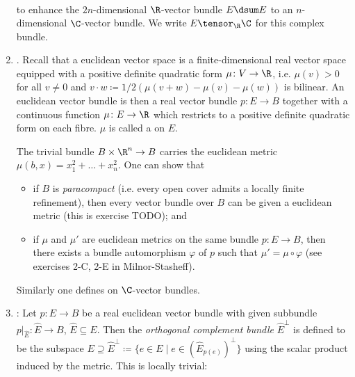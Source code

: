 \begin{definition}
\begin{enumerate}[resume]
\begin{align*}
			\end{align*}
			to enhance the $2n$-dimensional $\R$-vector bundle $E \dsum E$ to an $n$-dimensional $\C$-vector bundle.
			We write $E \tensor_{\R} \C$ for this complex bundle.
		\item {}.
			Recall that a euclidean vector space is a finite-dimensional real vector space equipped with a positive definite quadratic form $\mu\colon V \to \R$, i.e. $\mu(v) > 0$ for all $v \neq 0$ and $v \cdot w \coloneq 1 / 2 (\mu(v + w) - \mu(v) - \mu(w))$ is bilinear.
			An euclidean vector bundle is then a real vector bundle $p\colon E \to B$ together with a continuous function $\mu\colon E \to \R$ which restricts to a positive definite quadratic form on each fibre.
			$\mu$ is called a  on $E$.
			\begin{example}
				The trivial bundle $B \times \R^n \to B$ carries the euclidean metric $\mu(b, x) = x_1^2 + \ldots + x_n^2$.
				One can show that
				\begin{itemize}
					\item if $B$ is \emph{paracompact} (i.e. every open cover admits a locally finite refinement), then every vector bundle over $B$ can be given a euclidean metric (this is exercise TODO); and 
					\item if $\mu$ and $\mu'$ are euclidean metrics on the same bundle $p\colon E \to B$, then there exists a bundle automorphism $\varphi$ of $p$ such that $\mu' = \mu \circ \varphi$ (see exercises 2-C, 2-E in Milnor-Stasheff).
				\end{itemize}
			\end{example}
			Similarly one defines  on $\C$-vector bundles.
		\item {}:
			Let $p\colon E \to B$ be a real euclidean vector bundle with given subbundle $p|_{\hat{E}}\colon \hat{E} \to B$, $\hat{E} \subseteq E$.
			Then the \emph{orthogonal complement bundle} $\hat{E}^\perp$ is defined to be the subspace $E \supseteq \hat{E}^\perp \coloneq \{e \in E \mid e \in (\hat{E}_{p(e)})^\perp\}$ using the scalar product induced by the metric.
			This is locally trivial:

\end{enumerate}
\end{definition}
